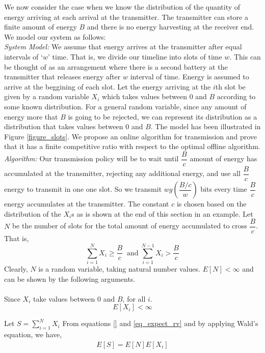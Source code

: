 We now consider the case when we know the distribution of the quantity of energy arriving at each arrival at the transmitter. The transmitter can store a finite amount of energy $B$ and there is no energy harvesting at the receiver end. We model our system as follows:\\
\textit{System Model:} We assume that energy arrives at the transmitter after equal intervals of `$w$' time. That is, we divide our timeline into slots of time $w$. This can be thought of as an arrangement where there is a second battery at the transmitter that releases energy after $w$ interval of time. Energy is assumed to arrive at the beggining of each slot. Let the energy arriving at the $i$th slot be given by a random variable $X_i$ which takes values between $0$ and $B$ according to some known distribution. For a general random variable, since any amount of energy more that $B$ is going to be rejected, we can represent its distribution as a distribution that takes values between $0$ and $B$. The model has been illustrated in Figure \ref{figure_slots}.
We propose an online algorithm for transmission and prove that it has a finite competitive ratio with respect to the optimal offline algorithm. 
\\
\textit{Algorithm:} Our transmission policy will be to wait until $\dfrac{B}{c}$ amount of energy has accumulated at the transmitter, rejecting any additional energy, and use all $\dfrac{B}{c}$ energy to transmit in one one slot. So we transmit $wg\left(\dfrac{B/c}{w}\right)$ bits every time $\dfrac{B}{c}$ energy accumulates at the transmitter. The constant $c$ is chosen based on the distribution of the $X_i$s as is shown at the end of this section in an example.
Let $N$ be the number of slots for the total amount of energy accumulated to cross $\dfrac{B}{c}$. That is,
\begin{equation}
 \displaystyle \sum_{i=1}^{N} X_i \ge \dfrac{B}{c} \;\;\text{and}\; \displaystyle \sum_{i=1}^{N-1} X_i > \dfrac{B}{c}
\end{equation}
Clearly, $N$ is a random variable, taking natural number values. $E[N]<\infty$ and can be shown by the following arguments.\\\\
Since $X_i$ take values between $0$ and $B$, for all $i$.
\begin{equation}
\label{eq_expect_rv}
E[X_i]<\infty
\end{equation}

Let $S=\displaystyle \sum_{i=1}^{N} X_i$ From equations \eqref{} and \eqref{eq_expect_rv} and by applying Wald's equation, we have,
\begin{align}
 E[S] = E[N]E[X_i]
\end{align}



